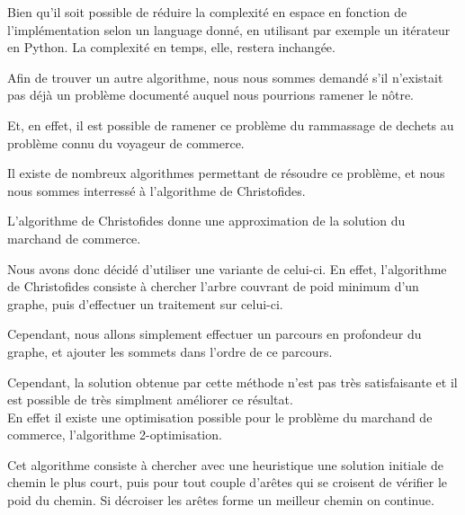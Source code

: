 \documentclass{report}
\begin{document}
  Bien qu'il soit possible de réduire la complexité en espace en fonction de l'implémentation selon un language donné, en utilisant par exemple un itérateur en Python. La complexité en temps, elle, restera inchangée.

  Afin de trouver un autre algorithme, nous nous sommes demandé s'il n'existait pas déjà un problème documenté auquel nous pourrions ramener le nôtre.

  Et, en effet, il est possible de ramener ce problème du rammassage de dechets au problème connu du voyageur de commerce.

  Il existe de nombreux algorithmes permettant de résoudre ce problème, et nous nous sommes interressé à l'algorithme de Christofides.
  
  L'algorithme de Christofides donne une approximation de la solution du marchand de commerce.

  Nous avons donc décidé d'utiliser une variante de celui-ci. En effet, l'algorithme de Christofides consiste à chercher l'arbre couvrant de poid minimum d'un graphe, puis d'effectuer un traitement sur celui-ci.


  Cependant, nous allons simplement effectuer un parcours en profondeur du graphe, et ajouter les sommets dans l'ordre de ce parcours.


  Cependant, la solution obtenue par cette méthode n'est pas très satisfaisante et il est possible de très simplment améliorer ce résultat. \\ 

  En effet il existe une optimisation possible pour le problème du marchand de commerce, l'algorithme 2-optimisation.

  Cet algorithme consiste à chercher avec une heuristique une solution initiale de chemin le plus court, puis pour tout couple d'arêtes qui se croisent de vérifier le poid du chemin. Si décroiser les arêtes forme un meilleur chemin on continue.
\end{document}
